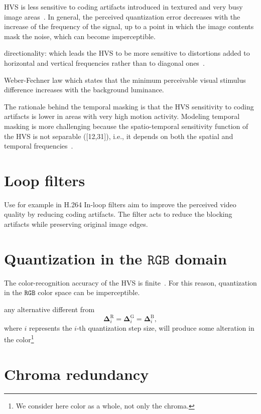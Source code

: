 HVS is less sensitive to coding artifacts introduced in textured and
very busy image areas~\cite{wu2017digital}. In general, the perceived
quantization error decreases with the increase of the frequency of the
signal, up to a point in which the image contents mask the noise,
which can become imperceptible.

directionality: which leads the HVS to be more sensitive to
distortions added to horizontal and vertical frequencies rather than
to diagonal ones~\cite{naccari2014perceptually}.

Weber-Fechner law which states
that the minimum perceivable visual stimulus difference increases with the background luminance.

The rationale behind the temporal masking is that the HVS sensitivity
to coding artifacts is lower in areas with very high motion
activity. Modeling temporal masking is more challenging because the
spatio-temporal sensitivity function of the HVS is not separable
([12,31]), i.e., it depends on both the spatial and temporal
frequencies~\cite{naccari2014perceptually}.

\section{Loop filters}
Use for example in H.264 In-loop filters aim to improve the perceived
video quality by reducing coding artifacts. The filter acts to reduce
the blocking artifacts while preserving original image edges.


\section{Quantization in the $\texttt{RGB}$ domain}

The color-recognition accuracy of the HVS is
finite~\cite{vruiz__visual_redundancy}. For this reason, quantization
in the $\texttt{RGB}$ color space can be imperceptible.

any alternative different from
\begin{equation}
  \mathbf{\Delta}^{\text{R}}_i = \mathbf{\Delta}^{\text{G}}_i =
  \mathbf{\Delta}^{\text{B}}_i,
  \label{eq:simple_Q}
\end{equation}
where $i$ represents the $i$-th quantization step size, will produce
some alteration in the color\footnote{We consider here color as a
whole, not only the chroma.}

\section{Chroma redundancy}

